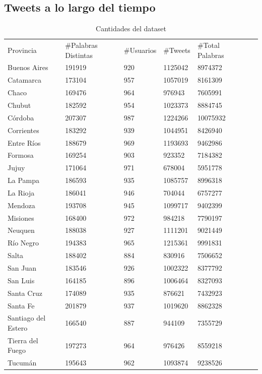 \subsection{Tweets a lo largo del tiempo}

\begin{table}[ht]
\centering
\caption{Cantidades del dataset}
\label{tab:cantidades}
\begin{tabular}[width=0.7\textwidth]{lllllll}
Provincia      & \#Palabras Distintas & \#Usuarios & \#Tweets & \#Total Palabras \\
Buenos Aires    & 191919       & 920          & 1125042    & 8974372  \\
Catamarca      & 173104       & 957          & 1057019    & 8161309   \\
Chaco          & 169476       & 964          & 976943     & 7605991   \\
Chubut         & 182592       & 954          & 1023373    & 8884745   \\
Córdoba        & 207307       & 987          & 1224266    & 10075932  \\
Corrientes     & 183292       & 939          & 1044951    & 8426940   \\
Entre Ríos      & 188679       & 969          & 1193693    & 9462986  \\
Formosa        & 169254       & 903          & 923352     & 7184382   \\
Jujuy          & 171064       & 971          & 678004     & 5951778   \\
La Pampa        & 186593       & 935          & 1085757    & 8996318  \\
La Rioja        & 186041       & 946          & 704044     & 6757277  \\
Mendoza        & 193708       & 945          & 1099717    & 9402399   \\
Misiones       & 168400       & 972          & 984218     & 7790197   \\
Neuquen        & 188038       & 927          & 1111201    & 9021449   \\
Río Negro       & 194383       & 965          & 1215361    & 9991831  \\
Salta          & 188402       & 884          & 830916     & 7506652   \\
San Juan        & 183546       & 926          & 1002322    & 8377792  \\
San Luis        & 164185       & 896          & 1006464    & 8327093  \\
Santa Cruz      & 174089       & 935          & 876621     & 7432923  \\
Santa Fe        & 201879       & 937          & 1019620    & 8862328  \\
Santiago del Estero       & 166540       & 887          & 944109     & 7355729  \\
Tierra del Fuego & 197273       & 964          & 976426     & 8559218   \\
Tucumán        & 195643       & 962          & 1093874    & 9238526  
\end{tabular}
\end{table}

